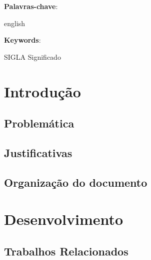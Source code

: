 \documentclass[
	12pt,	
	a4paper,			
	english,			
	french,				
	spanish,			
	brazil,
	oneside,
	sumario=tradicional
	]{abntex2}
\begin{document}
\setlength{\absparsep}{18pt} 

\begin{resumo}


 \textbf{Palavras-chave}: 
\end{resumo}

\begin{resumo}[Abstract]
 \begin{otherlanguage*}{english}
    
    \vspace{\onelineskip}
 
   \noindent 
   \textbf{Keywords}: 
 \end{otherlanguage*}
\end{resumo}

\listoffigures*
\cleardoublepage

\begin{siglas}
    \item[SIGLA] Significado
\end{siglas}

\tableofcontents*
\cleardoublepage


\textual

\chapter{Introdução}



\section{Problemática}


\section{Justificativas}




\section{Organização do documento}



\chapter{Desenvolvimento}



\section{Trabalhos Relacionados}
\end{document}
